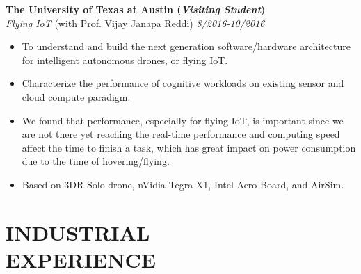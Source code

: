 \documentclass[margin, 9pt]{res} %
\begin{document}
\begin{resume}
\bigskip

{\large\textbf{The University of Texas at Austin (\textit{Visiting Student})}}\\

\vspace*{-7pt}
{\large\textit{Flying IoT} (with Prof. Vijay Janapa Reddi)} \hfill\textit{8/2016-10/2016}\\
\vspace*{-7pt}
\begin{itemize}[leftmargin=*] \itemsep -3pt
\vspace*{-5pt}
  \item To understand and build the next generation software/hardware
  architecture for intelligent autonomous drones, or flying IoT.
  \item Characterize the performance of cognitive workloads on existing sensor
  and cloud compute paradigm.
  \item We found that performance, especially for flying IoT, is important since
  we are not there yet reaching the real-time performance and computing speed
  affect the time to finish a task, which has great impact on power consumption
  due to the time of hovering/flying.
  \item Based on 3DR Solo drone, nVidia Tegra X1, Intel Aero Board, and AirSim.
\end{itemize}

\section{INDUSTRIAL\\ EXPERIENCE}


\end{resume}
\end{document}

